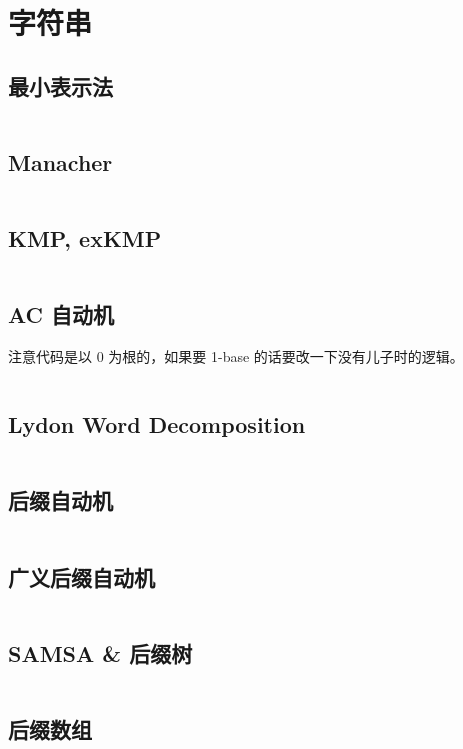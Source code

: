 			\section{字符串}
				\subsection{最小表示法}
					\inputminted{cpp}{src/String/最小表示法.cpp}
				\subsection{Manacher}
					\inputminted{cpp}{src/String/Manacher.cpp}
				\subsection{KMP, exKMP}
					\inputminted{cpp}{src/String/KMP.cpp}
				\subsection{AC 自动机}
					注意代码是以 0 为根的，如果要 1-base 的话要改一下没有儿子时的逻辑。
					\inputminted{cpp}{src/String/AC 自动机.cpp}
				\subsection{Lydon Word Decomposition}
					\inputminted{cpp}{src/String/Lyndon Word.cpp}
				\subsection{后缀自动机}
					\inputminted{cpp}{src/String/SAM.cpp}
				\subsection{广义后缀自动机}
					\inputminted{cpp}{src/String/generalizedSAM.cpp}
				\subsection{SAMSA \& 后缀树}
					\inputminted{cpp}{src/String/SAMSA.cpp}
				\subsection{后缀数组}
					\inputminted{cpp}{src/String/SA.cpp}
